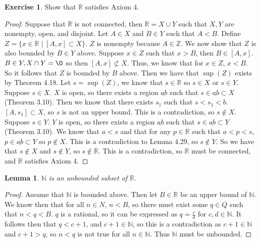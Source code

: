\documentclass[12pt]{article}
\newcommand{\bbN}{\mathbb{N}}
\newcommand{\bbR}{\mathbb{R}}
\newcommand{\bbZ}{\mathbb{Z}}
\renewcommand{\emptyset}{\O}
\renewcommand{\_}[1]{\underline{ #1 }}
\newtheorem{lemma}[theorem]{Lemma}
\theoremstyle{definition}
\newtheorem{exercise}[theorem]{Exercise}
\numberwithin{equation}{subsection}
\begin{document}
\begin{exercise} Show that $\bbR$ satisfies Axiom 4.
\end{exercise}

\begin{proof}
Suppose that $\bbR$ is not connected, then $\bbR = X \cup Y$ such that $X,Y$ are nonempty, open, and disjoint. Let $A \in X$ and $B \in Y$ such that $A < B$. Define $Z = \{x \in \bbR \mid [A,x] \subset X\}$. $Z$ is nonempty because $A \in \bbZ$. We now show that $Z$ is also bounded by $B \in Y$ above. Suppose $x \in Z$ such that $x > B$, then $B \in [A,x]$. $B \in Y, X \cap Y = \emptyset$ so then $[A,x] \not \subset X$. Thus, we know that for $x \in Z$, $x < B$. So it follows that $Z$ is bounded by $B$ above. Then we have that $\sup(Z)$ exists by Theorem 4.18. \newline
Let $s = \sup(Z)$, we know that $s \in \bbR$ so $s \in X$ or $s \in Y$. \newline
Suppose $s \in X$. $X$ is open, so there exists a region $\_{ab}$ such that $s \in \_{ab} \subset X$ (Theorem 3.10). Then we know that there exists $s_1$ such that $s < s_1 < b$. $[A, s_1] \subset X$, so $s$ is not an upper bound. This is a contradiction, so $s \not \in X$. \newline
Suppose $s \in Y$. $Y$ is open, so there exists a region $\_{ab}$ such that $s \in \_{ab} \subset Y$ (Theorem 3.10). We know that $a < s$ and that for any $p \in \bbR$ such that $a < p < s$, $p \in \_{ab} \subset Y$ so $p \not \in X$. This is a contradiction to Lemma 4.29, so $s \not \in Y$. \newline
So we have that $s \not \in X$ and $s \not \in Y$, so $s \not \in \bbR$. This is a contradiction, so $\bbR$ must be connected, and $\bbR$ satisfies Axiom 4.
\end{proof}

\begin{lemma}
$\bbN$ is an unbounded subset of $\bbR.$ 
\end{lemma}

\begin{proof}
Assume that $\bbN$ is bounded above. Then let $B \in \bbR$ be an upper bound of $\bbN$. We know then that for all $n \in N$, $n < B$, so there must exist some $q \in Q$ such that $n < q < B$. $q$ is a rational, so it can be expressed as $q = \frac{c}{d}$ for $c,d \in \bbN$. It follows then that $q < c + 1$, and $c + 1 \in \bbN$, so this is a contradiction as $c + 1 \in \bbN$ and $c + 1 > q$, so $n < q$ is not true for all $n \in \bbN$. Thus $\bbN$ must be unbounded.
\end{proof}
\end{document}
